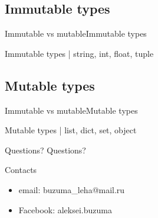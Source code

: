 \documentclass[10pt]{beamer}
\begin{document}
\subsection{Immutable types}
\begin{frame}{Immutable vs mutable}{Immutable types}
	\begin{block}{Immutable types | string, int, float, tuple}
		\immutable
	\end{block}
\end{frame}

\subsection{Mutable types}
\begin{frame}{Immutable vs mutable}{Mutable types}
	\begin{block}{Mutable types | list, dict, set, object}
		\mutable
	\end{block}
\end{frame}

\begin{frame}{Questions?}
\large Questions?
\begin{center}
		
	\begin{block}{Contacts}
		\begin{itemize}
			\item email:    buzuma\_leha@mail.ru
			\item Facebook: aleksei.buzuma
		\end{itemize}
	\end{block}
	
\end{center}
		
\end{frame}
\end{document}
